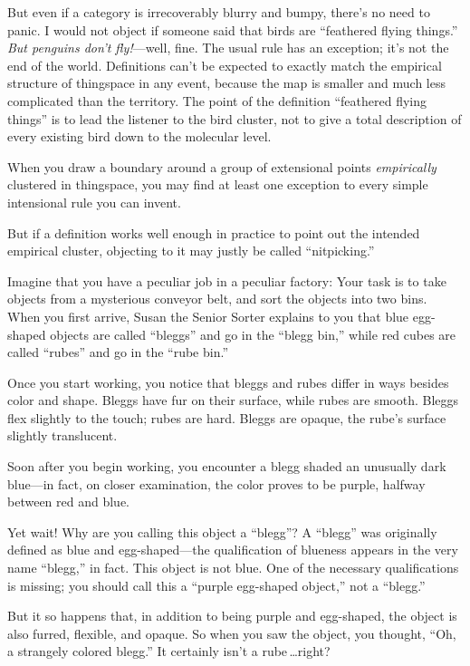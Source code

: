 { But even if a category is irrecoverably blurry and bumpy,
there's no need to panic. I would not object if someone
said that birds are ``feathered flying
things.'' \textit{But penguins don't
fly!}{}---well, fine. The usual rule has an exception;
it's not the end of the world. Definitions
can't be expected to exactly match the empirical
structure of thingspace in any event, because the map is smaller and
much less complicated than the territory. The point of the definition
``feathered flying things'' is to
lead the listener to the bird cluster, not to give a total description
of every existing bird down to the molecular level.


 When you draw a boundary around a group of extensional points
\textit{empirically} clustered in thingspace, you may find at least one
exception to every simple intensional rule you can invent.


 But if a definition works well enough in practice to point out the
intended empirical cluster, objecting to it may justly be called
``nitpicking.''

\myendsectiontext



 Imagine that you have a peculiar job in a peculiar factory: Your
task is to take objects from a mysterious conveyor belt, and sort the
objects into two bins. When you first arrive, Susan the Senior Sorter
explains to you that blue egg-shaped objects are called
``bleggs'' and go in the
``blegg bin,'' while red cubes are
called ``rubes'' and go in the
``rube bin.'' 


 Once you start working, you notice that bleggs and rubes differ in
ways besides color and shape. Bleggs have fur on their surface, while
rubes are smooth. Bleggs flex slightly to the touch; rubes are hard.
Bleggs are opaque, the rube's surface slightly
translucent.


 Soon after you begin working, you encounter a blegg shaded an
unusually dark blue---in fact, on closer examination, the color proves
to be purple, halfway between red and blue.


 Yet wait! Why are you calling this object a
``blegg''? A
``blegg'' was originally defined as
blue and egg-shaped---the qualification of blueness appears in the very
name ``blegg,'' in fact. This object
is not blue. One of the necessary qualifications is missing; you should
call this a ``purple egg-shaped
object,'' not a
``blegg.''


 But it so happens that, in addition to being purple and
egg-shaped, the object is also furred, flexible, and opaque. So when
you saw the object, you thought, ``Oh, a strangely
colored blegg.'' It certainly isn't a
rube\,\ldots right?


}
